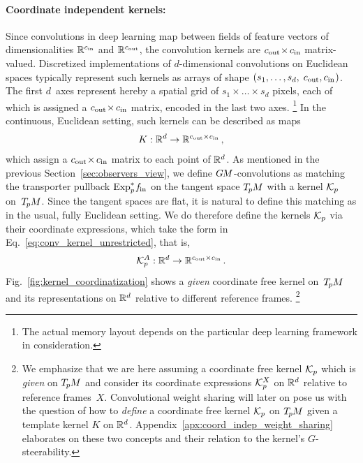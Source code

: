 \paragraph{Coordinate independent kernels:}
Since convolutions in deep learning map between fields of feature vectors of dimensionalities $\mathbb{R}^{c_\textup{in}}$ and $\mathbb{R}^{c_\textup{out}}$, the convolution kernels are ${{c_\textup{out}} \mkern-3mu\times\mkern-1.5mu {c_\textup{in}}}$ matrix-valued.
Discretized implementations of $d$-dimensional convolutions on Euclidean spaces typically represent such kernels as arrays of shape $(s_1,\dots,s_d, \; c_\text{out},c_\text{in} \mkern1mu)$.
The first $d$~axes represent hereby a spatial grid of $s_1 \times\dots\times s_d$ pixels, each of which is assigned a ${{c_\textup{out}} \mkern-3mu\times\mkern-1.5mu {c_\textup{in}}}$ matrix, encoded in the last two axes.%
\footnote{
    The actual memory layout depends on the particular deep learning framework in consideration.
}
In the continuous, Euclidean setting, such kernels can be described as maps
\begin{align}\label{eq:conv_kernel_unrestricted}
    K: \mathbb{R}^d \to \mathbb{R}^{{c_\textup{out}}\times{c_\textup{in}}} \,,
\end{align}
which assign a ${{c_\textup{out}} \mkern-3mu\times\mkern-1.5mu {c_\textup{in}}}$ matrix to each point of $\mathbb{R}^d$.
As mentioned in the previous Section~\ref{sec:observers_view}, we define $G\mkern-1.4muM$-convolutions as matching the transporter pullback $\operatorname{Exp}^*_p\mkern-2mu f_\textup{\;\!\!in}$
on the tangent space $T_{\mkern-1.5mu p}\mkern-.5muM$ with a kernel $\mathcal{K}_p$ on~$T_{\mkern-1.5mu p}\mkern-.5muM$.
Since the tangent spaces are flat, it is natural to define this matching as in the usual, fully Euclidean setting.
We do therefore define the kernels $\mathcal{K}_p$ via their coordinate expressions, which take the form in Eq.~\eqref{eq:conv_kernel_unrestricted}, that is,
\begin{align}
    \mathcal{K}_p^A: \mathbb{R}^d \to \mathbb{R}^{{c_\textup{out}}\times{c_\textup{in}}} \,.
\end{align}
Fig.~\ref{fig:kernel_coordinatization} shows a \emph{given} coordinate free kernel on~$T_{\mkern-1.5mu p}\mkern-.5muM$ and its representations on $\mathbb{R}^d$ relative to different reference frames.%
\footnote{
    We emphasize that we are here assuming a coordinate free kernel $\mathcal{K}_p$ which is \emph{given} on $T_{\mkern-1.5mu p}\mkern-.5muM$ and consider its coordinate expressions $\mathcal{K}_p^X$ on $\mathbb{R}^d$ relative to reference frames~$X$.
    Convolutional weight sharing will later on pose us with the question of how to \emph{define} a coordinate free kernel $\mathcal{K}_p$ on $T_{\mkern-1.5mu p}\mkern-.5muM$ given a template kernel $K$ on $\mathbb{R}^d$.
    Appendix~\ref{apx:coord_indep_weight_sharing} elaborates on these two concepts and their relation to the kernel's $G$-steerability.
}


